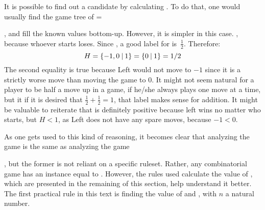 It is possible to find out a candidate by calculating \Gm{ + \Hm + \Hm}. To do that, one would usually find the game tree of 
\Gm{ + \Hm + \Hm} = 
, and fill the known values bottom-up. However, it is simpler in this case. , because whoever starts loses. Since , a good label for \Hm is~$\frac{1}{2}$. Therefore:
$$H = \mbox{$\{{-}1, 0\:|\:1\}$} = \mbox{$\{0\:|\:1\}$} = 1/2$$
 The second equality is true because Left would not move to $-1$ since it is a strictly worse move than moving the game to $0$. It might not seem natural for a player to be half a move up in a game, if he/she always plays one move at a time, but it if it is desired that $\frac{1}{2} + \frac{1}{2} = 1$, that label makes sense for addition. It might be valuable to reiterate that \Hm is definitely positive because left wins no matter who starts, but $H < 1$, as Left does not have any spare moves, because \Hm $- 1 < 0$.

As one gets used to this kind of reasoning, it becomes clear that analyzing the game  is the same as analyzing the game 
, but the former is not reliant on a specific ruleset. Rather, any combinatorial game has an instance equal to . However, the rules used calculate the value of , which are presented in the remaining of this section, help understand it better. The first practical rule in this text is finding the value of  and , with $n$ a natural number.

